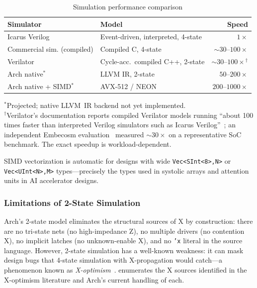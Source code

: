 \documentclass[11pt,twocolumn]{article}
\begin{document}
\begin{table}[!t]
\centering
\caption{Simulation performance comparison}
\label{tab:perf}
\footnotesize
\begin{tabular}{@{}llr@{}}
\toprule
\textbf{Simulator} & \textbf{Model} & \textbf{Speed} \\
\midrule
Icarus Verilog~\cite{icarus} & Event-driven, interpreted, 4-state & $1\times$ \\
Commercial sim. (compiled) & Compiled C, 4-state & ${\sim}30$--$100\times$ \\
Verilator~\cite{verilator} & Cycle-acc.\ compiled C++, 2-state & ${\sim}30$--$100\times$$^\dagger$ \\
Arch native$^\ast$ & LLVM IR, 2-state & $50$--$200\times$ \\
Arch native + SIMD$^\ast$ & AVX-512 / NEON & $200$--$1000\times$ \\
\bottomrule
\end{tabular}

\vspace{0.4em}
\raggedright\footnotesize
$^\ast$Projected; native LLVM~IR backend not yet implemented.\\
$^\dagger$Verilator's documentation reports compiled Verilator models running ``about 100 times faster than interpreted Verilog simulators such as Icarus Verilog''~\cite{verilator}; an independent Embecosm evaluation~\cite{embecosm2013} measured ${\sim}30\times$ on a representative SoC benchmark. The exact speedup is workload-dependent.
\end{table}

SIMD vectorization is automatic for designs with wide \texttt{Vec<SInt<8>,N>} or \texttt{Vec<UInt<N>,M>} types---precisely the types used in systolic arrays and attention units in AI accelerator designs.

\subsubsection{Limitations of 2-State Simulation}

Arch's 2-state model eliminates the structural sources of X by construction: there are no tri-state nets (no high-impedance Z), no multiple drivers (no contention X), no implicit latches (no unknown-enable X), and no \texttt{'x} literal in the source language. However, 2-state simulation has a well-known weakness: it can mask design bugs that 4-state simulation with X-propagation would catch---a phenomenon known as \emph{X-optimism}~\cite{zhao2014xoptimism}.  enumerates the X sources identified in the X-optimism literature and Arch's current handling of each.
\end{document}
